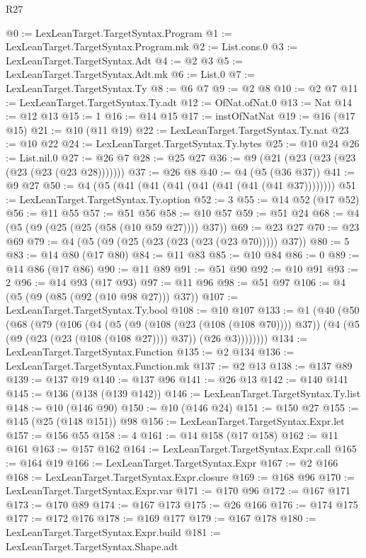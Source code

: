 \begin{lexlean}{R27}
\begin{coremodule}
@0 := LexLeanTarget.TargetSyntax.Program
@1 := LexLeanTarget.TargetSyntax.Program.mk
@2 := List.cons.{0}
@3 := LexLeanTarget.TargetSyntax.Adt
@4 := @2 @3
@5 := LexLeanTarget.TargetSyntax.Adt.mk
@6 := List.{0}
@7 := LexLeanTarget.TargetSyntax.Ty
@8 := @6 @7
@9 := @2 @8
@10 := @2 @7
@11 := LexLeanTarget.TargetSyntax.Ty.adt
@12 := OfNat.ofNat.{0}
@13 := Nat
@14 := @12 @13
@15 := 1
@16 := @14 @15
@17 := instOfNatNat
@19 := @16 (@17 @15)
@21 := @10 (@11 @19)
@22 := LexLeanTarget.TargetSyntax.Ty.nat
@23 := @10 @22
@24 := LexLeanTarget.TargetSyntax.Ty.bytes
@25 := @10 @24
@26 := List.nil.{0}
@27 := @26 @7
@28 := @25 @27
@36 := @9 (@21 (@23 (@23 (@23 (@23 (@23 (@23 @28)))))))
@37 := @26 @8
@40 := @4 (@5 (@36 @37))
@41 := @9 @27
@50 := @4 (@5 (@41 (@41 (@41 (@41 (@41 (@41 (@41 @37))))))))
@51 := LexLeanTarget.TargetSyntax.Ty.option
@52 := 3
@55 := @14 @52 (@17 @52)
@56 := @11 @55
@57 := @51 @56
@58 := @10 @57
@59 := @51 @24
@68 := @4 (@5 (@9 (@25 (@25 (@58 (@10 @59 @27)))) @37))
@69 := @23 @27
@70 := @23 @69
@79 := @4 (@5 (@9 (@25 (@23 (@23 (@23 (@23 @70))))) @37))
@80 := 5
@83 := @14 @80 (@17 @80)
@84 := @11 @83
@85 := @10 @84
@86 := 0
@89 := @14 @86 (@17 @86)
@90 := @11 @89
@91 := @51 @90
@92 := @10 @91
@93 := 2
@96 := @14 @93 (@17 @93)
@97 := @11 @96
@98 := @51 @97
@106 := @4 (@5 (@9 (@85 (@92 (@10 @98 @27))) @37))
@107 := LexLeanTarget.TargetSyntax.Ty.bool
@108 := @10 @107
@133 := @1
    (@40
      (@50
        (@68
          (@79
            (@106
              (@4
                (@5 (@9 (@108 (@23 (@108 (@108 @70)))) @37))
                (@4 (@5 (@9 (@23 (@23 (@108 (@108 @27)))) @37)) (@26 @3))))))))
@134 := LexLeanTarget.TargetSyntax.Function
@135 := @2 @134
@136 := LexLeanTarget.TargetSyntax.Function.mk
@137 := @2 @13
@138 := @137 @89
@139 := @137 @19
@140 := @137 @96
@141 := @26 @13
@142 := @140 @141
@145 := @136 (@138 (@139 @142))
@146 := LexLeanTarget.TargetSyntax.Ty.list
@148 := @10 (@146 @90)
@150 := @10 (@146 @24)
@151 := @150 @27
@155 := @145 (@25 (@148 @151)) @98
@156 := LexLeanTarget.TargetSyntax.Expr.let
@157 := @156 @55
@158 := 4
@161 := @14 @158 (@17 @158)
@162 := @11 @161
@163 := @157 @162
@164 := LexLeanTarget.TargetSyntax.Expr.call
@165 := @164 @19
@166 := LexLeanTarget.TargetSyntax.Expr
@167 := @2 @166
@168 := LexLeanTarget.TargetSyntax.Expr.closure
@169 := @168 @96
@170 := LexLeanTarget.TargetSyntax.Expr.var
@171 := @170 @96
@172 := @167 @171
@173 := @170 @89
@174 := @167 @173
@175 := @26 @166
@176 := @174 @175
@177 := @172 @176
@178 := @169 @177
@179 := @167 @178
@180 := LexLeanTarget.TargetSyntax.Expr.build
@181 := LexLeanTarget.TargetSyntax.Shape.adt

\end{coremodule}
\end{lexlean}
